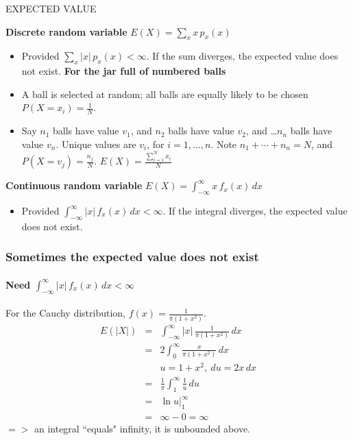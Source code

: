 \documentclass{beamer}
\begin{document}
\begin{frame}
\hypertarget{meanlabel}{EXPECTED VALUE}\newline
\textbf{Discrete random variable}	$E(X) = \sum_x x \, p_x(x)$
\begin{itemize}
\item Provided $\sum_x |x| \, p_x(x) < \infty$. If the sum diverges, the expected value does not exist. 
\textbf{For the jar full of numbered balls}
\item A ball is selected at random; all balls are equally likely to be chosen $P(X = x_i) = \frac{1}{N}$.
\item Say $n_1$ balls have value $v_1$, and $n_2$ balls have value $v_2$, and \ldots  $n_n$ balls have value $v_n$. Unique values are $v_i$, for $i=1, \ldots, n$. Note $n_1 + \cdots + n_n = N$, and $P(X=v_j) = \frac{n_j}{N}$. 
$E(X) = \frac{\sum_{i=1}^N x_i}{N}$

\end{itemize}

\textbf{Continuous random variable}  $E(X) = \int_{-\infty}^\infty x \, f_x(x) \, dx$

\begin{itemize}
\item Provided $ \int_{-\infty}^\infty |x| \, f_x(x) \, dx < \infty$. If the integral diverges, the expected value does not exist. 

\end{itemize}

\end{frame}



\begin{frame}
\frametitle{Sometimes the expected value does not exist}
\framesubtitle{Need $ \int_{-\infty}^\infty |x| \, f_x(x) \, dx < \infty$}  
For the Cauchy distribution, $f(x) = \frac{1}{\pi(1+x^2)}$.  
\begin{eqnarray*}
E(|X|) & = & \int_{-\infty}^\infty |x| \, \frac{1}{\pi(1+x^2)} \, dx \\ 
& = & 2 \int_0^\infty \frac{x}{\pi(1+x^2)} \, dx \\ 
&& u = 1+x^2, ~du = 2x \, dx \\  
& = & \frac{1}{\pi} \int_1^\infty \frac{1}{u} \, du \\ 
& = & \ln u |_1^\infty \\ 
& = & \infty - 0 = \infty 
\end{eqnarray*} 
$=>$ an integral ``equals" infinity, it is unbounded above.
\end{frame}
\end{document}
